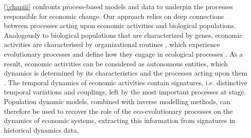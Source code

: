 % 
% 
\cref{\chapiii} confronts process-based models and data to underpin the processes responsible for economic change.
% 
Our approach relies on deep connections between processes acting upon economic activities and biological populations.
% 
Analogously to biological populations that are characterized by genes, economic activities are characterised by organizational routines \citep{NelsonWinter}, which experience evolutionary processes and define how they engage in ecological processes \citep{NelsonWinter}.
% 
% 
As a result, economic activities can be considered as autonomous entities, which dynamics is determined by its characteristics and the processes acting upon them \citep{Boschma2005a}.
% 
The temporal dynamics of economic activities contain signatures, i.e. distinctive temporal variations and couplings, left by the most important processes at stage.
% 
Population dynamic models, combined with inverse modelling methods, can therefore be used to recover the role of the eco-evolutionary processes on the dynamics of economic systems, extracting this information from signatures in historical dynamics data.

